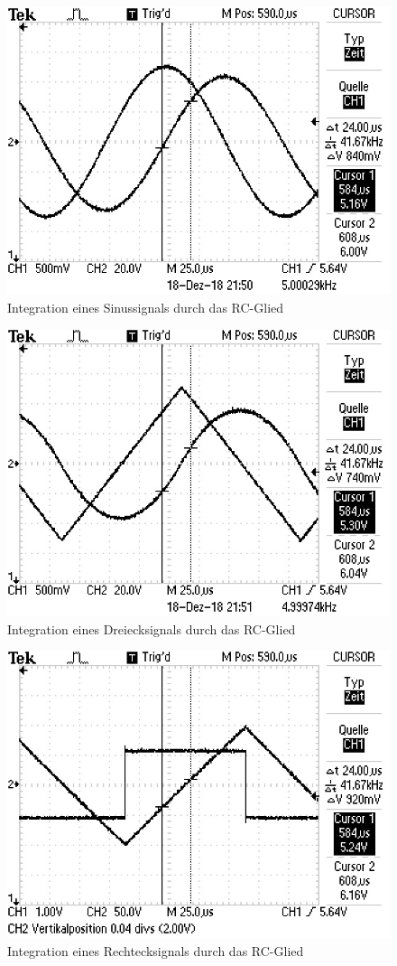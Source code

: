\begin{figure}
  \centering
  \includegraphics[angle=90, scale=0.8]{content/Sinus.jpg}
  \caption{Integration eines Sinussignals durch das RC-Glied}
  \label{fig:Sinus}
\end{figure}

\begin{figure}
  \centering
  \includegraphics[angle=90, scale=0.8]{content/Dreieck.jpg}
  \caption{Integration eines Dreiecksignals durch das RC-Glied}
  \label{fig:Dreieck}
\end{figure}

\begin{figure}
  \centering
  \includegraphics[angle=90, scale=0.8]{content/Rechteck.jpg}
  \caption{Integration eines Rechtecksignals durch das RC-Glied}
  \label{fig:Rechteck}
\end{figure}
